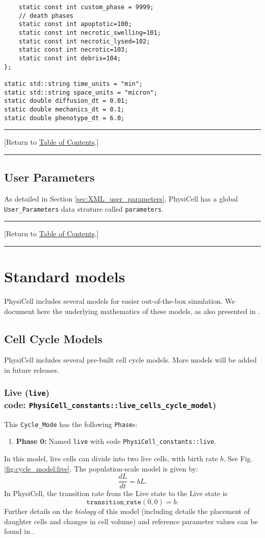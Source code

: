 \documentclass[12pt]{article}
\newcommand{\beq}{\begin{equation}}
\newcommand{\eeq}{\end{equation}}
\renewcommand{\v}{\verb}
\newcommand{\blue}[1]{\textcolor{blue}{#1}}
\newcommand{\DONE}{}%
\newcommand{\TOClink}{\begin{center}\hrule\vskip-10pt\phantom{.}\hfill[Return to \hyperlink{TOC}{Table of Contents}.]\hfill\phantom{.}\vskip3pt\hrule\end{center}}
\begin{document}
\begin{verbatim}
    static const int custom_phase = 9999;
    // death phases
    static const int apoptotic=100;
    static const int necrotic_swelling=101;
    static const int necrotic_lysed=102;
    static const int necrotic=103; 
    static const int debris=104; 
};

static std::string time_units = "min";
static std::string space_units = "micron";
static double diffusion_dt = 0.01; 
static double mechanics_dt = 0.1;
static double phenotype_dt = 6.0;
\end{verbatim}

\TOClink 

\subsection{User Parameters}
\label{sec:global_user_parameters}
As detailed in Section \ref{sec:XML_user_parameters}, PhysiCell has a global 
\v|User_Parameters| data struture called \v|parameters|. 
\TOClink 

\section{Standard models \DONE}
\label{sec:Standard_Models}
PhysiCell includes several models for easier out-of-the-box simulation. 
We document here the underlying mathematics of these models, as also 
presented in \cite{ref:PhysiCell}. 

\subsection{Cell Cycle Models \DONE}
\label{sec:Standard_Models:Cycle}
PhysiCell includes several pre-built cell cycle models. More models 
will be added in future releases. 

\subsubsection{Live (\texttt{live})\\
code: \texttt{PhysiCell\_constants::live\_cells\_cycle\_model})}
\label{sec:Standard_Models:Live}
This \v|Cycle_Mode| has the following \v|Phase|s: 
\begin{enumerate}
\item 
\textbf{Phase 0:} Named \v|live| with code \v|PhysiCell_constants::live|. 
\end{enumerate}
In this model, live cells can divide into two live cells, with 
birth rate $b$. See Fig. \ref{fig:cycle_model:live}. The 
population-scale model is given by: 
\beq
\frac{dL}{dt} = b L. 
\eeq
In PhysiCell, the transition rate 
from the Live state to the Live state is 
\beq
\texttt{transition\_rate}(0,0) = b. 
\eeq
Further details on the \emph{biology} of this model (including 
details the placement of daughter cells and changes in cell 
volume) and reference parameter values can be found in \cite{ref:PhysiCell}. 
\end{document}

